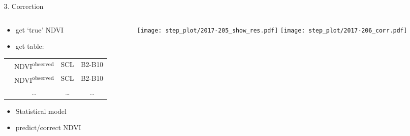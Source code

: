 \begin{frame}[t]{3. Correction}
    \begin{columns}
        \begin{column}{0.45\textwidth}
            \begin{itemize}
                \item get `true' NDVI
                \item get table:
            \end{itemize}

            \small
            \begin{tabular}{| c |  c c c |}
                \hline
                \color{myred}{NDVI\textsuperscript{`true'}} & NDVI\textsuperscript{observed} & SCL & B2-B10 \\
                \color{myred}{NDVI\textsuperscript{`true'}} & NDVI\textsuperscript{observed} & SCL & B2-B10 \\
                \color{myred}{\dots    } & \dots    & \dots     & \dots  \\
            \end{tabular}\normalsize \vspace{0.5cm}
            \begin{itemize}
                \item Statistical model
                \item predict/correct NDVI
            \end{itemize}
        \end{column}
        \begin{column}{0.42\textwidth}
            \begin{figure}
                \vspace{-1.8cm}
                \texttt{[image: step\_plot/2017-205\_show\_res.pdf]}
                \texttt{[image: step\_plot/2017-206\_corr.pdf]}
            \end{figure}
        \end{column}
    \end{columns}
\end{frame}

